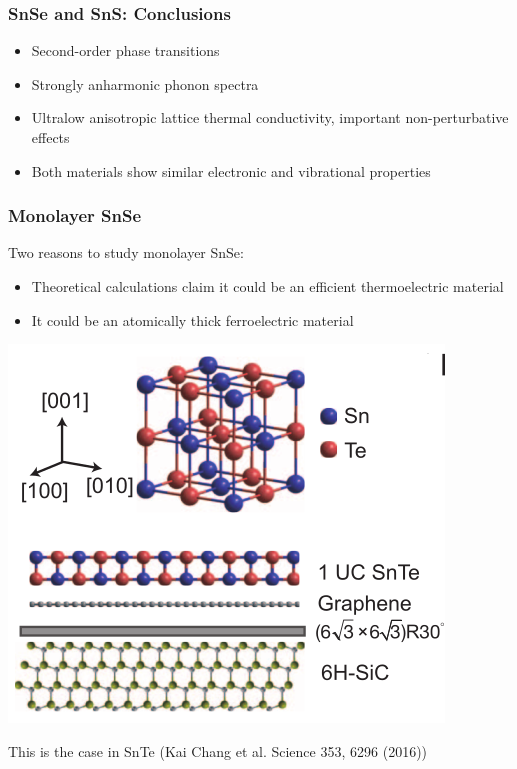 \documentclass{beamer}
\begin{document}

\begin{frame}

\frametitle{SnSe and SnS: Conclusions}
\begin{itemize}
 \item Second-order phase transitions
 \item Strongly anharmonic phonon spectra
 \item Ultralow anisotropic lattice thermal conductivity, important non-perturbative effects
 \item Both materials show similar electronic and vibrational properties
\end{itemize}

\end{frame}


\begin{frame}

\frametitle{Monolayer SnSe}
Two reasons to study monolayer SnSe:
\begin{itemize}
\item Theoretical calculations claim it could be an efficient thermoelectric material
\item It could be an atomically thick ferroelectric material
\end{itemize}
\begin{center}
 \includegraphics[width=0.45\linewidth]{Pictures/MonoSnSe/monoSnTe.png}
\end{center}
This is the case in SnTe (Kai Chang et al. Science 353, 6296 (2016))

\end{frame}

\end{document}
